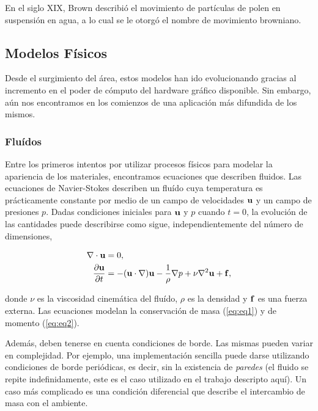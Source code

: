En el siglo XIX, Brown describió el movimiento de partículas de polen en suspensión en agua, a lo cual se le otorgó el nombre de movimiento browniano.


\cite{Ebert2002}


\subsection{Modelos Físicos}
Desde el surgimiento del área, estos modelos han ido evolucionando gracias al incremento en el poder de cómputo del hardware gráfico disponible. Sin embargo, aún nos encontramos en los comienzos de una aplicación más difundida de los mismos.

\subsubsection{Fluídos}
Entre los primeros intentos por utilizar procesos físicos para modelar la apariencia de los materiales, encontramos ecuaciones que describen fluidos.
Las ecuaciones de Navier-Stokes describen un fluído cuya temperatura es prácticamente constante por medio de un campo de velocidades $\bold{u}$ y un campo de presiones $p$.
Dadas condiciones iniciales para $\bold{u}$ y $p$ cuando $t = 0$, la evolución de las cantidades puede describirse como sigue, independientemente del número de dimensiones,

\begin{align}
\nabla \cdot \bold{u} &= 0, \label{eq:eq1}\\
\frac{\partial \bold{u} }{\partial t} &= - (\bold{u} \cdot \nabla) \bold{u} - \frac{1}{\rho} \nabla p + \nu \nabla^{2} \bold{u} + \bold{f} \label{eq:eq2},
\end{align}

donde $\nu$ es la viscosidad cinemática del fluído, $\rho$ es la densidad y $\bold{f}$ es una fuerza externa.
Las ecuaciones modelan la conservación de masa (\ref{eq:eq1}) y de momento (\ref{eq:eq2}).

Además, deben tenerse en cuenta condiciones de borde.
Las mismas pueden variar en complejidad.
Por ejemplo, una implementación sencilla puede darse utilizando condiciones de borde periódicas, es decir, sin la existencia de {\em paredes} (el fluido se repite indefinidamente, este es el caso utilizado en el trabajo descripto aquí).
Un caso más complicado es una condición diferencial que describe el intercambio de masa con el ambiente.

